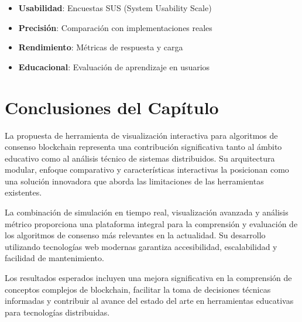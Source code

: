 \begin{itemize}
    \item \textbf{Usabilidad}: Encuestas SUS (System Usability Scale)
    \item \textbf{Precisión}: Comparación con implementaciones reales
    \item \textbf{Rendimiento}: Métricas de respuesta y carga
    \item \textbf{Educacional}: Evaluación de aprendizaje en usuarios
\end{itemize}

\section{Conclusiones del Capítulo}

La propuesta de herramienta de visualización interactiva para algoritmos de consenso blockchain representa una contribución significativa tanto al ámbito educativo como al análisis técnico de sistemas distribuidos. Su arquitectura modular, enfoque comparativo y características interactivas la posicionan como una solución innovadora que aborda las limitaciones de las herramientas existentes.

La combinación de simulación en tiempo real, visualización avanzada y análisis métrico proporciona una plataforma integral para la comprensión y evaluación de los algoritmos de consenso más relevantes en la actualidad. Su desarrollo utilizando tecnologías web modernas garantiza accesibilidad, escalabilidad y facilidad de mantenimiento.

Los resultados esperados incluyen una mejora significativa en la comprensión de conceptos complejos de blockchain, facilitar la toma de decisiones técnicas informadas y contribuir al avance del estado del arte en herramientas educativas para tecnologías distribuidas.
